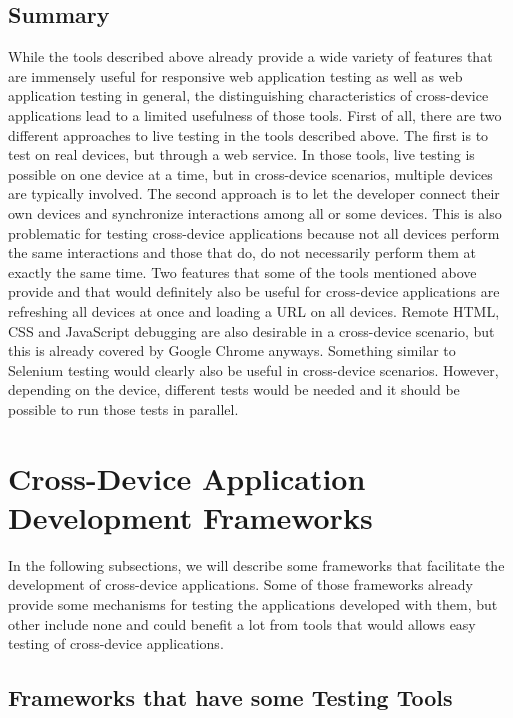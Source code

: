 \subsection{Summary}

While the tools described above already provide a wide variety of features that are immensely useful for responsive web application testing as well as web application testing in general, the distinguishing characteristics of cross-device applications lead to a limited usefulness of those tools. First of all, there are two different approaches to live testing in the tools described above. The first is to test on real devices, but through a web service. In those tools, live testing is possible on one device at a time, but in cross-device scenarios, multiple devices are typically involved. The second approach is to let the developer connect their own devices and synchronize interactions among all or some devices. This is also problematic for testing cross-device applications because not all devices perform the same interactions and those that do, do not necessarily perform them at exactly the same time. Two features that some of the tools mentioned above provide and that would definitely also be useful for cross-device applications are refreshing all devices at once and loading a URL on all devices. Remote HTML, CSS and JavaScript debugging are also desirable in a cross-device scenario, but this is already covered by Google Chrome anyways. Something similar to Selenium testing would clearly also be useful in cross-device scenarios. However, depending on the device, different tests would be needed and it should be possible to run those tests in parallel.

\section{Cross-Device Application Development Frameworks}

In the following subsections, we will describe some frameworks that facilitate the development of cross-device applications. Some of those frameworks already provide some mechanisms for testing the applications developed with them, but other include none and could benefit a lot from tools that would allows easy testing of cross-device applications.

\subsection{Frameworks that have some Testing Tools}

